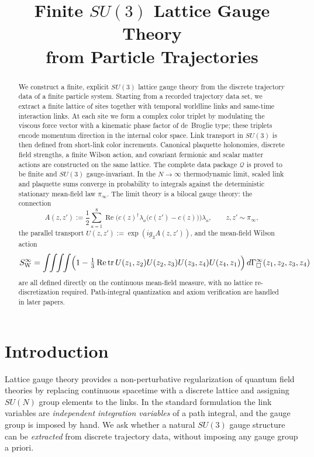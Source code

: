 \documentclass[11pt]{article}
\title{Finite $SU(3)$ Lattice Gauge Theory\\
from Particle Trajectories}
\author{}
\date{}
\theoremstyle{remark}
\begin{document}
\maketitle

\begin{abstract}
We construct a finite, explicit $SU(3)$ lattice gauge theory from the discrete
trajectory data of a finite particle system.
Starting from a recorded trajectory data set, we extract a finite lattice of
sites together with temporal worldline links and same-time interaction links.
At each site we form a complex color triplet by modulating the viscous force
vector with a kinematic phase factor of de~Broglie type; these triplets encode
momentum direction in the internal color space.
Link transport in $SU(3)$ is then defined from short-link color increments.
Canonical plaquette holonomies, discrete field strengths, a finite Wilson action,
and covariant fermionic and scalar matter actions are constructed on the same
lattice.
The complete data package $\mathcal Q$ is proved to be finite and $SU(3)$
gauge-invariant.
In the $N\to\infty$ thermodynamic limit, scaled link and plaquette sums converge
in probability to integrals against the deterministic stationary mean-field law
$\pi_\infty$.
The limit theory is a bilocal gauge theory: the connection
\[
A(z,z'):=\frac12\sum_{a=1}^8
\operatorname{Re}\!\bigl(c(z)^\dagger\lambda_a\bigl(c(z')-c(z)\bigr)\bigr)\lambda_a,
\qquad z,z'\sim\pi_\infty,
\]
the parallel transport $U(z,z'):=\exp(ig_3 A(z,z'))$, and the mean-field Wilson
action
\[
S_{\mathrm W}^\infty
=\int\!\!\int\!\!\int\!\!\int
\Bigl(1-\tfrac13\operatorname{Re}\operatorname{tr} U(z_1,z_2)U(z_2,z_3)U(z_3,z_4)U(z_4,z_1)\Bigr)
\,d\Gamma_\square^\infty(z_1,z_2,z_3,z_4)
\]
are all defined directly on the continuous mean-field measure, with no lattice
re-discretization required.
Path-integral quantization and axiom verification are handled in later papers.
\end{abstract}

\tableofcontents

\section{Introduction}
\label{sec:intro}

Lattice gauge theory provides
a non-perturbative regularization of quantum field theories by replacing
continuous spacetime with a discrete lattice and assigning $SU(N)$ group elements
to the links.
In the standard formulation the link variables are
\emph{independent integration variables} of a path integral, and the gauge group
is imposed by hand.
We ask whether a natural
$SU(3)$ gauge structure can be \emph{extracted} from discrete trajectory data,
without imposing any gauge group a priori.
\end{document}
